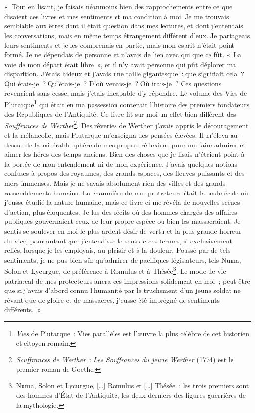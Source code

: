 {«~Tout en lisant, je faisais néanmoins bien des rapprochements entre
ce que disaient ces livres et mes sentiments et ma condition à moi.
Je me trouvais semblable aux êtres dont il était question dans mes
lectures, et dont j'entendais les conversations, mais en même temps
étrangement différent d'eux. Je partageais leurs sentiments et je les
comprenais en partie, mais mon esprit n'était point formé. Je ne
dépendais de personne et n'avais de lien avec qui que ce fût. «~La
voie de mon départ était libre~», et il n'y avait personne qui pût
déplorer ma disparition. J'étais hideux et j'avais une taille
gigantesque~: que signifiait cela~? Qui étais-je~? Qu'étais-je~? D'où
venais-je~? Où irais-je~? Ces questions revenaient sans cesse, mais
j'étais incapable d'y répondre. Le volume des Vies de
Plutarque\footnote{\textit{Vies} de Plutarque~: Vies parallèles est l'œuvre la
plus célèbre de cet historien et citoyen romain.} qui était en ma
possession contenait l'histoire des premiers fondateurs des
Républiques de l'Antiquité. Ce livre fit sur moi un effet bien
différent des \textit{Souffrances de Werther}\footnote{\textit{Souffrances de Werther}~: \textit{Les Souffrances du jeune Werther} (1774) est le premier roman de
Goethe.}. Des rêveries de Werther j'avais appris le découragement et
la mélancolie, mais Plutarque m'enseigna des pensées élevées. Il
m'éleva au-dessus de la misérable sphère de mes propres réflexions
pour me faire admirer et aimer les héros des temps anciens. Bien des
choses que je lisais n'étaient point à la portée de mon entendement
ni de mon expérience. J'avais quelques notions confuses à propos des
royaumes, des grands espaces, des fleuves puissants et des mers
immenses. Mais je ne savais absolument rien des villes et des grands
rassemblements humains. La chaumière de mes protecteurs était la
seule école où j'eusse étudié la nature humaine, mais ce livre-ci me
révéla de nouvelles scènes d'action, plus éloquentes. Je lus des
récits où des hommes chargés des affaires publiques gouvernaient ceux
de leur propre espèce ou bien les massacraient. Je sentis se soulever
en moi le plus ardent désir de vertu et la plus grande horreur du
vice, pour autant que j'entendisse le sens de ces termes, si
exclusivement reliés, lorsque je les employais, au plaisir et à la
douleur. Poussé par de tels sentiments, je ne pus bien sûr qu'admirer
de pacifiques législateurs, tels Numa, Solon et Lycurgue, de
préférence à Romulus et à Thésée\footnote{Numa, Solon et Lycurgue,
[…] Romulus et […] Thésée~: les trois premiers sont des hommes d'État
de l'Antiquité, les deux derniers des figures guerrières de la
mythologie.}. Le mode de vie patriarcal de mes protecteurs ancra ces
impressions solidement en moi~; peut-être que si j'avais d'abord
connu l'humanité par le truchement d'un jeune soldat ne rêvant que de
gloire et de massacres, j'eusse été imprégné de sentiments
différents.~»
}


